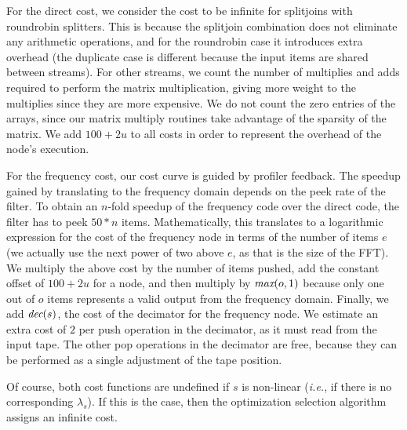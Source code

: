 \clearpage
For the direct cost, we consider the cost to be infinite for
splitjoins with roundrobin splitters.  This is because the splitjoin
combination does not eliminate any arithmetic operations, and for the
roundrobin case it introduces extra overhead (the duplicate case is
different because the input items are shared between streams).  For
other streams, we count the number of multiplies and adds required to
perform the matrix multiplication, giving more weight to the
multiplies since they are more expensive.  We do not count the zero
entries of the arrays, since our matrix multiply routines take
advantage of the sparsity of the matrix.  We add $100+2u$ to all costs
in order to represent the overhead of the node's execution.

For the frequency cost, our cost curve is guided by profiler feedback.
The speedup gained by translating to the frequency domain depends on
the peek rate of the filter.  To obtain an $n$-fold speedup of the
frequency code over the direct code, the filter has to peek $50*n$
items.  Mathematically, this translates to a logarithmic expression
for the cost of the frequency node in terms of the number of items $e$
(we actually use the next power of two above $e$, as that is the size
of the FFT).  We multiply the above cost by the number of items pushed,
add the constant offset of $100+2u$ for a node, and then multiply by
$\mbox{\it max}(o, 1)$ because only one out of $o$ items represents a valid
output from the frequency domain.  Finally, we add $\mbox{\it dec}(s)$, the
cost of the decimator for the frequency node.  We estimate an extra
cost of $2$ per push operation in the decimator, as it must read from
the input tape.  The other pop operations in the decimator are free,
because they can be performed as a single adjustment of the tape
position.

Of course, both cost functions are undefined if $s$ is non-linear
({\it i.e.}, if there is no corresponding $\lambda_s$). If this is the
case, then the optimization selection algorithm assigns an infinite
cost.


